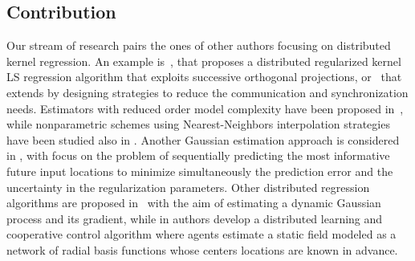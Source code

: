 \documentclass[10pt,twocolumn,twoside]{IEEEtran}					%
\theoremstyle	{plain}
\begin{document}
\vspace{-2mm}
\subsection{Contribution}

Our stream of research pairs the ones of other authors focusing on distributed kernel regression. An example is~\cite{predd2009collaborative}, that proposes a distributed regularized kernel \ac{LS} regression algorithm that exploits successive orthogonal projections, or~\cite{perez2010robust} that extends \cite{predd2009collaborative} by designing strategies to reduce the communication and synchronization needs. Estimators with reduced order model complexity have been proposed in~\cite{honeine2008distributed}, while nonparametric schemes using Nearest-Neighbors interpolation strategies have been studied also in \cite{martinez__2010__distributed_interpolation_schemes_for_field_estimation_by_mobile_sensor_networks}. Another Gaussian estimation approach is considered in \cite{xu2013efficient}, with focus on the problem of sequentially predicting the most informative future input locations to minimize simultaneously the prediction error and the uncertainty in the regularization parameters. Other distributed regression algorithms are proposed in~\cite{cortes__2009__distributed_kriged_kalman_filter_for_spatial_estimation} with the aim of estimating a dynamic Gaussian process and its gradient, while in \cite{choi_et_al__2009__distributed_learning_and_cooperative_control_for_multi-agent_systems} authors develop a distributed learning and cooperative control algorithm where agents estimate a static field modeled as a network of radial basis functions whose centers locations are known in advance.
\end{document}
